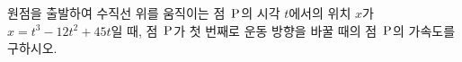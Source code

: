 원점을 출발하여 수직선 위를 움직이는 점~$\mathrm{P}$의 시각 $t$에서의 위치 $x$가 $x=t^3-12t^2+45t$일 때, 점~$\mathrm{P}$가 첫 번째로 운동 방향을 바꿀 때의 점~$\mathrm{P}$의 가속도를 구하시오.
